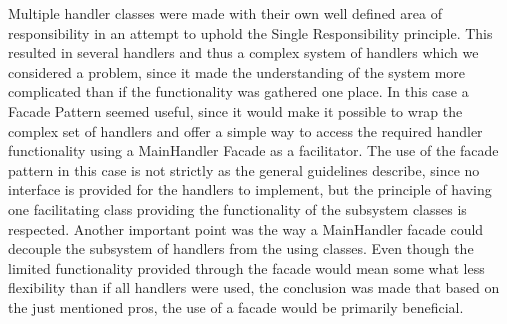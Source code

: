 Multiple handler classes were made with their own well defined area of responsibility in an attempt to uphold the Single Responsibility principle. This resulted in several handlers and thus a complex system of handlers which we considered a problem, since it made the understanding of the system more complicated than if the functionality was gathered one place.
In this case a Facade Pattern seemed useful, since it would make it possible to wrap the complex set of handlers and offer a simple way to access the required handler functionality using a MainHandler Facade as a facilitator.
The use of the facade pattern in this case is not strictly as the general guidelines describe, since no interface is provided for the handlers to implement, but the principle of having one facilitating class providing the functionality of the subsystem classes is respected.
Another important point was the way a MainHandler facade could decouple the subsystem of handlers from the using classes.
Even though the limited functionality provided through the facade would mean some what less flexibility than if all handlers were used, the conclusion was made that based on the just mentioned pros, the use of a facade would be primarily beneficial.
